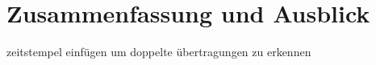 \chapter{Zusammenfassung und Ausblick}
\label{sec:Zusammenfassung}
\pagestyle{scrheadings}

zeitstempel einfügen um doppelte übertragungen zu erkennen
